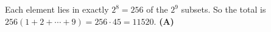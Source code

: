 Each element lies in exactly $2^8=256$ of the $2^9$ subsets. So the total is $256(1+2+\cdots+9)=256\cdot45=11520$. \textbf{(A)}
